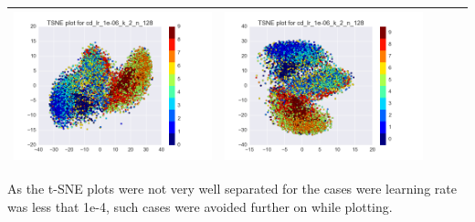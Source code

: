 \documentclass[12pt]{report}
\begin{document}
\begin{table}[H]
\begin{tabular}{ | c | c | c | c || c |}
\begin{minipage}{.3\textwidth}
      \includegraphics[scale=0.25]{cd_lr_1e-06_k_2_n_128.png}
    \end{minipage} &
    \begin{minipage}{.3\textwidth}
      \includegraphics[scale=0.25]{test_cd_lr_1e-06_k_2_n_128.png}
    \end{minipage}
        \\ \hline
  \end{tabular}
\end{table}

As the t-SNE plots were not very well separated for the cases were learning rate was less that 1e-4, such cases were avoided further on while plotting.
\end{document}
